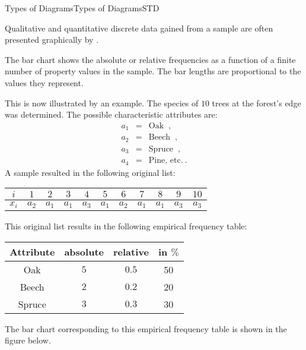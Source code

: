 \begin{MXContent}{Types of Diagrams}{Types of Diagrams}{STD}

Qualitative and quantitative discrete data gained from a sample are often presented graphically by 
.

\begin{MInfo}
The bar chart shows the absolute or relative frequencies as a function of a finite number of property values 
in the sample. The bar lengths are proportional to the values they represent.
\end{MInfo}

This is now illustrated by an example. The species of $10$ trees at the forest's edge was determined. 
The possible characteristic attributes are:
\begin{eqnarray*}
a_{1}& =& \text{Oak} \;\; , \\
a_{2}& =& \text{Beech}\;\; , \\
a_{3}& =& \text{Spruce}\;\; , \\
a_{4}& =& \text{Pine, etc.}\: .
\end{eqnarray*}
A sample resulted in the following original list:

\begin{center}
\begin{tabular}{|c|c|c|c|c|c|c|c|c|c|c|}
\hline
$i$ & $1$ & $2$ & $3$ & $4$ & $5$ & $6$ & $7$ & $8$ & $9$ & $10$ \\ \hline
$x_i$ & $a_2$ & $a_1$ & $a_1$ & $a_3$ & $a_1$ & $a_2$ & $a_1$ & $a_1$ & $a_3$ & $a_3$ \\ \hline
\end{tabular}
\end{center}

This original list results in the following  empirical frequency table:

\begin{center}
\begin{tabular}{|c|c|c|c|}
\hline
Attribute & absolute & relative & in $\%$\\ \hline
Oak & $5$ & $0.5$ & 50 \\ \hline
Beech & $2$ & $0.2$ & 20 \\ \hline
Spruce & $3$ & $0.3$ & 30 \\ \hline
\end{tabular}
\end{center}

The bar chart corresponding to this empirical frequency table is shown in the figure below. 


\end{MXContent}
